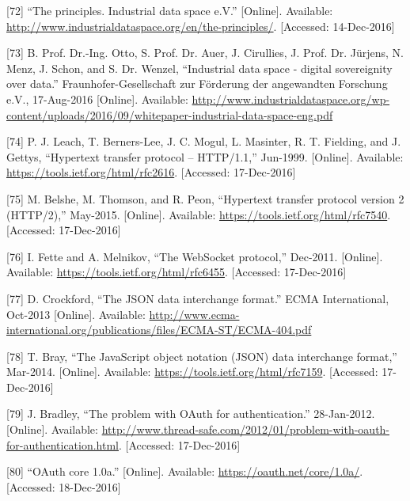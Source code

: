 \documentclass[12pt,english,a4paper,titlepage,cleardoublepage=empty,dottedtoc]{report}
\begin{document}
\hypertarget{ref-web_industrial-data-space}{}
{[}72{]} ``The principles. Industrial data space e.V.'' {[}Online{]}.
Available: \url{http://www.industrialdataspace.org/en/the-principles/}.
{[}Accessed: 14-Dec-2016{]}

\hypertarget{ref-whitepaper_2016_industrial-data-space}{}
{[}73{]} B. Prof. Dr.-Ing. Otto, S. Prof. Dr. Auer, J. Cirullies, J.
Prof. Dr. Jürjens, N. Menz, J. Schon, and S. Dr. Wenzel, ``Industrial
data space - digital sovereignity over data.'' Fraunhofer-Gesellschaft
zur Förderung der angewandten Forschung e.V., 17-Aug-2016 {[}Online{]}.
Available:
\url{http://www.industrialdataspace.org/wp-content/uploads/2016/09/whitepaper-industrial-data-space-eng.pdf}

\hypertarget{ref-web_spec_http1}{}
{[}74{]} P. J. Leach, T. Berners-Lee, J. C. Mogul, L. Masinter, R. T.
Fielding, and J. Gettys, ``Hypertext transfer protocol -- HTTP/1.1,''
Jun-1999. {[}Online{]}. Available:
\url{https://tools.ietf.org/html/rfc2616}. {[}Accessed: 17-Dec-2016{]}

\hypertarget{ref-web_spec_http2}{}
{[}75{]} M. Belshe, M. Thomson, and R. Peon, ``Hypertext transfer
protocol version 2 (HTTP/2),'' May-2015. {[}Online{]}. Available:
\url{https://tools.ietf.org/html/rfc7540}. {[}Accessed: 17-Dec-2016{]}

\hypertarget{ref-web_spec_websockets}{}
{[}76{]} I. Fette and A. Melnikov, ``The WebSocket protocol,'' Dec-2011.
{[}Online{]}. Available: \url{https://tools.ietf.org/html/rfc6455}.
{[}Accessed: 17-Dec-2016{]}

\hypertarget{ref-web_spec_json}{}
{[}77{]} D. Crockford, ``The JSON data interchange format.'' ECMA
International, Oct-2013 {[}Online{]}. Available:
\url{http://www.ecma-international.org/publications/files/ECMA-ST/ECMA-404.pdf}

\hypertarget{ref-web_rfc_json}{}
{[}78{]} T. Bray, ``The JavaScript object notation (JSON) data
interchange format,'' Mar-2014. {[}Online{]}. Available:
\url{https://tools.ietf.org/html/rfc7159}. {[}Accessed: 17-Dec-2016{]}

\hypertarget{ref-web_2012_problem-with-oauth-for-authentication}{}
{[}79{]} J. Bradley, ``The problem with OAuth for authentication.''
28-Jan-2012. {[}Online{]}. Available:
\url{http://www.thread-safe.com/2012/01/problem-with-oauth-for-authentication.html}.
{[}Accessed: 17-Dec-2016{]}

\hypertarget{ref-web_spec_oauth-1a}{}
{[}80{]} ``OAuth core 1.0a.'' {[}Online{]}. Available:
\url{https://oauth.net/core/1.0a/}. {[}Accessed: 18-Dec-2016{]}
\end{document}
